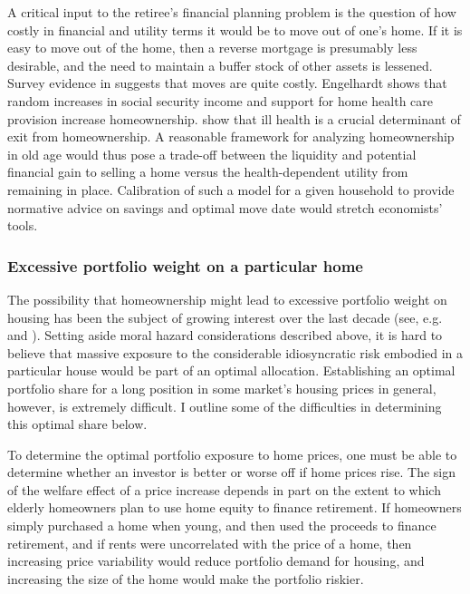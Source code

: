 \documentclass[12pt]{article}
\begin{document}
A critical input to the retiree's financial planning problem is the question of
how costly in financial and utility terms it would be to move out of one's home.
If it is easy to move out of the home, then a reverse mortgage is presumably
less desirable, and the need to maintain a buffer stock of other assets is
lessened.  Survey evidence in \citet{AARP} suggests that moves are quite costly.
Engelhardt shows that random increases in social security income  and support
for home health care provision increase homeownership.  \citet{CoileMilligan}
show that ill health is a crucial determinant of exit from homeownership.  A
reasonable framework for analyzing homeownership in old age would thus pose
a trade-off between the liquidity and potential financial gain to selling a home
versus the health-dependent utility from remaining in place.  Calibration of
such a model for a given household to provide normative advice on savings and
optimal move date would stretch economists' tools.

\subsubsection{Excessive portfolio weight on a particular home}

The possibility that homeownership might lead to excessive portfolio weight on
housing has been the subject of growing interest over the last decade (see, e.g.
\citet{FlavinYamashita} and \citet{Brueckner}).  Setting aside moral hazard
considerations described above, it is hard to believe that massive exposure to
the considerable idiosyncratic risk embodied in a particular house would be part
of an optimal allocation.  Establishing an optimal portfolio share for a long
position in some market's housing prices in general, however, is extremely
difficult.  I outline some of the difficulties in determining this optimal share
below.

To determine the optimal portfolio exposure to home prices, one must be able to
determine whether an investor is better or worse off if home prices rise.  The
sign of the welfare effect of a price increase depends in part on the extent to
which elderly homeowners plan to use home equity to finance retirement.  If
homeowners simply purchased a home when young, and then used the proceeds to
finance retirement, and if rents were uncorrelated with the price of a home,
then increasing price variability would reduce portfolio demand for housing, and
increasing the size of the home would make the portfolio riskier.  
\end{document}
